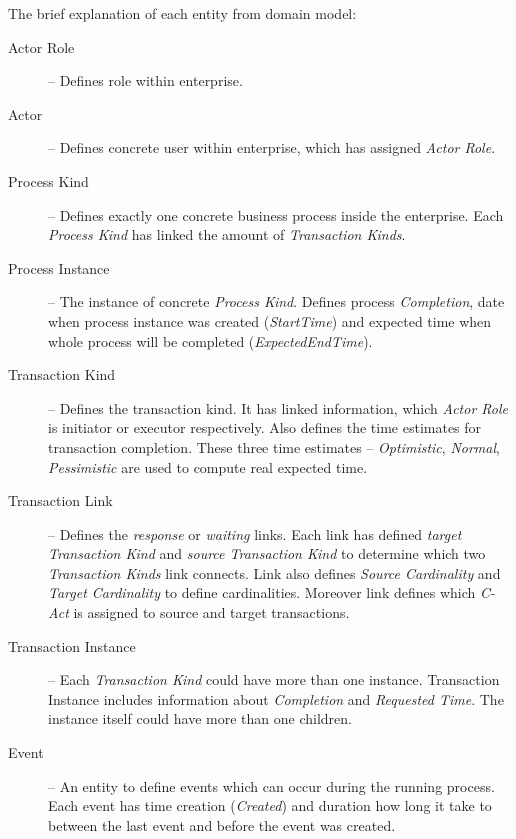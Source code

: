 The brief explanation of each entity from domain model:
\begin{description}
\item[Actor Role] -- Defines role within enterprise. 
\item[Actor] -- Defines concrete user within enterprise, which has assigned \textit{Actor Role}.

\item[Process Kind] -- Defines exactly one concrete business process inside the enterprise. Each \textit{Process Kind} has linked the amount of \textit{Transaction Kinds}.

\item[Process Instance] -- The instance of concrete \textit{Process Kind}. Defines process \textit{Completion}, date when process instance was created (\textit{StartTime}) and expected time when whole process will be completed (\textit{ExpectedEndTime}).

\item[Transaction Kind] -- Defines the transaction kind. It has linked information, which \textit{Actor Role} is initiator or executor respectively. Also defines the time estimates for transaction completion. These three time estimates -- \textit{Optimistic}, \textit{Normal}, \textit{Pessimistic} are used to compute real expected time. 

\item[Transaction Link] -- Defines the \textit{response} or \textit{waiting} links. Each link has defined \textit{target Transaction Kind}  and \textit{source Transaction Kind} to determine which two \textit{Transaction Kinds} link connects. Link also defines \textit{Source Cardinality} and \textit{Target Cardinality} to define cardinalities. Moreover link defines which \textit{C-Act} is assigned to source and target transactions.  

\item[Transaction Instance] -- Each \textit{Transaction Kind} could have more than one instance. Transaction Instance includes information about \textit{Completion} and \textit{Requested Time}. The instance itself could have more than one children. 

\item[Event] -- An entity to define events which can occur during the running process. Each event has time creation (\textit{Created}) and duration how long it take to between the last event and before the event was created.

\end{description}

